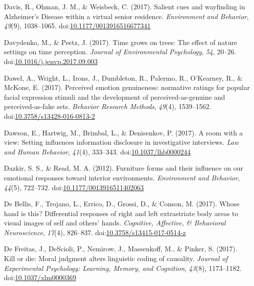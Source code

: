 \documentclass[english,man]{apa6}
\theoremstyle{definition}
\theoremstyle{definition}
\theoremstyle{definition}
\theoremstyle{remark}
\begin{document}
\hypertarget{ref-Davis2017}{}
Davis, R., Ohman, J. M., \& Weisbeck, C. (2017). Salient cues and
wayfinding in Alzheimer's Disease within a virtual senior residence.
\emph{Environment and Behavior}, \emph{49}(9), 1038--1065.
doi:\href{https://doi.org/10.1177/0013916516677341}{10.1177/0013916516677341}

\hypertarget{ref-Davydenko2017}{}
Davydenko, M., \& Peetz, J. (2017). Time grows on trees: The effect of
nature settings on time perception. \emph{Journal of Environmental
Psychology}, \emph{54}, 20--26.
doi:\href{https://doi.org/10.1016/j.jenvp.2017.09.003}{10.1016/j.jenvp.2017.09.003}

\hypertarget{ref-Dawel2017}{}
Dawel, A., Wright, L., Irons, J., Dumbleton, R., Palermo, R., O'Kearney,
R., \& McKone, E. (2017). Perceived emotion genuineness: normative
ratings for popular facial expression stimuli and the development of
perceived-as-genuine and perceived-as-fake sets. \emph{Behavior Research
Methods}, \emph{49}(4), 1539--1562.
doi:\href{https://doi.org/10.3758/s13428-016-0813-2}{10.3758/s13428-016-0813-2}

\hypertarget{ref-Dawson2017}{}
Dawson, E., Hartwig, M., Brimbal, L., \& Denisenkov, P. (2017). A room
with a view: Setting influences information disclosure in investigative
interviews. \emph{Law and Human Behavior}, \emph{41}(4), 333--343.
doi:\href{https://doi.org/10.1037/lhb0000244}{10.1037/lhb0000244}

\hypertarget{ref-Dazkir2012}{}
Dazkir, S. S., \& Read, M. A. (2012). Furniture forms and their
influence on our emotional responses toward interior environments.
\emph{Environment and Behavior}, \emph{44}(5), 722--732.
doi:\href{https://doi.org/10.1177/0013916511402063}{10.1177/0013916511402063}

\hypertarget{ref-DeBellis2017}{}
De Bellis, F., Trojano, L., Errico, D., Grossi, D., \& Conson, M.
(2017). Whose hand is this? Differential responses of right and left
extrastriate body areas to visual images of self and others' hands.
\emph{Cognitive, Affective, \& Behavioral Neuroscience}, \emph{17}(4),
826--837.
doi:\href{https://doi.org/10.3758/s13415-017-0514-z}{10.3758/s13415-017-0514-z}

\hypertarget{ref-DeFreitas2017}{}
De Freitas, J., DeScioli, P., Nemirow, J., Massenkoff, M., \& Pinker, S.
(2017). Kill or die: Moral judgment alters linguistic coding of
causality. \emph{Journal of Experimental Psychology: Learning, Memory,
and Cognition}, \emph{43}(8), 1173--1182.
doi:\href{https://doi.org/10.1037/xlm0000369}{10.1037/xlm0000369}
\end{document}
